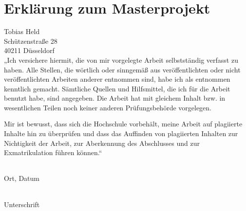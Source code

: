 \section*{Erklärung zum Masterprojekt}

Tobias Held\\
Schützenstraße 28\\
40211 Düsseldorf\\

„Ich versichere hiermit, die von mir vorgelegte Arbeit selbstständig verfasst zu haben. Alle Stellen, die wörtlich oder sinngemäß aus veröffentlichten oder nicht veröffentlichten Arbeiten anderer entnommen sind, habe ich als entnommen kenntlich gemacht. Sämtliche Quellen und Hilfsmittel, die ich für die Arbeit benutzt habe, sind angegeben. Die Arbeit hat mit gleichem Inhalt bzw. in wesentlichen Teilen noch keiner anderen Prüfungsbehörde vorgelegen.

Mir ist bewusst, dass sich die Hochschule vorbehält, meine Arbeit auf plagiierte Inhalte hin zu überprüfen und dass das Auffinden von plagiierten Inhalten zur Nichtigkeit der Arbeit, zur Aberkennung des Abschlusses und zur Exmatrikulation führen können.“
\vspace{3cm}


\noindent\parbox[t]{5cm}{\underline{\hspace{5cm}}\\\noindent Ort, Datum}%
\hfill%
\noindent\parbox[t]{5cm}{\noindent\underline{\hspace{5cm}}\\\noindent Unterschrift}%
